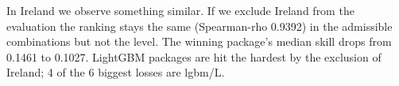 In Ireland we observe something similar. If we exclude Ireland from the evaluation the ranking stays the same (Spearman-rho 0.9392) in the admissible combinations but not the level. The winning package's median skill drops from 0.1461 to 0.1027. LightGBM packages are hit the hardest by the exclusion of Ireland; 4 of the 6 biggest losses are lgbm/L.
